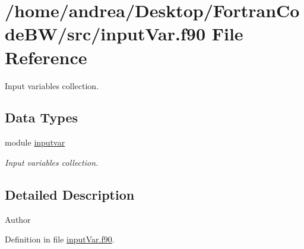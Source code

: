 \hypertarget{input_var_8f90}{\section{/home/andrea/\-Desktop/\-Fortran\-Code\-B\-W/src/input\-Var.f90 File Reference}
\label{input_var_8f90}
}


Input variables collection.  


\subsection*{Data Types}
\begin{DoxyCompactItemize}
\item 
module \hyperlink{classinputvar}{inputvar}
\begin{DoxyCompactList}\small\item\em Input variables collection. \end{DoxyCompactList}\end{DoxyCompactItemize}


\subsection{Detailed Description}
\begin{DoxyAuthor}{Author}

\end{DoxyAuthor}


Definition in file \hyperlink{input_var_8f90_source}{input\-Var.\-f90}.


